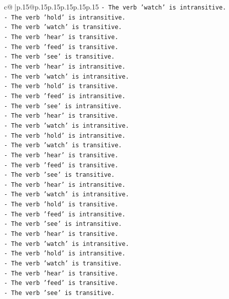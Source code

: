 \documentclass{article}
\begin{document}
{\begin{supertabular}{c@{$\;$}|p{.15\linewidth}@{}p{.15\linewidth}p{.15\linewidth}p{.15\linewidth}p{.15\linewidth}p{.15\linewidth}}
{{{\texttt{{-} The verb 'watch' is intransitive.} \\
\texttt{{-} The verb 'hold' is intransitive.} \\
\texttt{{-} The verb 'watch' is transitive.} \\
\texttt{{-} The verb 'hear' is transitive.} \\
\texttt{{-} The verb 'feed' is transitive.} \\
\texttt{{-} The verb 'see' is transitive.} \\
\texttt{{-} The verb 'hear' is intransitive.} \\
\texttt{{-} The verb 'watch' is intransitive.} \\
\texttt{{-} The verb 'hold' is transitive.} \\
\texttt{{-} The verb 'feed' is intransitive.} \\
\texttt{{-} The verb 'see' is intransitive.} \\
\texttt{{-} The verb 'hear' is transitive.} \\
\texttt{{-} The verb 'watch' is intransitive.} \\
\texttt{{-} The verb 'hold' is intransitive.} \\
\texttt{{-} The verb 'watch' is transitive.} \\
\texttt{{-} The verb 'hear' is transitive.} \\
\texttt{{-} The verb 'feed' is transitive.} \\
\texttt{{-} The verb 'see' is transitive.} \\
\texttt{{-} The verb 'hear' is intransitive.} \\
\texttt{{-} The verb 'watch' is intransitive.} \\
\texttt{{-} The verb 'hold' is transitive.} \\
\texttt{{-} The verb 'feed' is intransitive.} \\
\texttt{{-} The verb 'see' is intransitive.} \\
\texttt{{-} The verb 'hear' is transitive.} \\
\texttt{{-} The verb 'watch' is intransitive.} \\
\texttt{{-} The verb 'hold' is intransitive.} \\
\texttt{{-} The verb 'watch' is transitive.} \\
\texttt{{-} The verb 'hear' is transitive.} \\
\texttt{{-} The verb 'feed' is transitive.} \\
\texttt{{-} The verb 'see' is transitive.} \\
}}}
\end{supertabular}}
\end{document}
